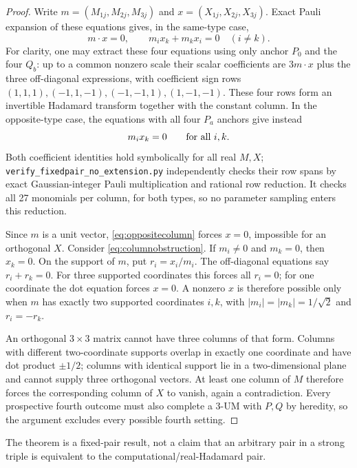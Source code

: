 \documentclass[11pt]{article}
\begin{document}
\begin{proof}
Write $m=(M_{1j},M_{2j},M_{3j})$ and
$x=(X_{1j},X_{2j},X_{3j})$. Exact Pauli expansion of these equations
gives, in the same-type case,
\begin{equation}\label{eq:columnobstruction}
 m\cdot x=0,\qquad m_i x_k+m_k x_i=0\quad(i\ne k).
\end{equation}
For clarity, one may extract these four equations using only anchor
$P_0$ and the four $Q_b$: up to a common nonzero scale their scalar
coefficients are $3m\cdot x$ plus the three off-diagonal expressions,
with coefficient sign rows
$(1,1,1),(-1,1,-1),(-1,-1,1),(1,-1,-1)$.
These four rows form an invertible Hadamard transform together with the
constant column. In the opposite-type case, the equations with all four
$P_a$ anchors give instead
\begin{equation}\label{eq:oppositecolumn}
 m_i x_k=0\qquad\hbox{for all }i,k.
\end{equation}
Both coefficient identities hold symbolically for all real $M,X$;
\texttt{verify\_fixedpair\_no\_extension.py} independently checks their
row spans by exact Gaussian-integer Pauli multiplication and rational
row reduction. It checks all 27 monomials per column, for both types,
so no parameter sampling enters this reduction.

Since $m$ is a unit vector, \eqref{eq:oppositecolumn} forces $x=0$,
impossible for an orthogonal $X$. Consider \eqref{eq:columnobstruction}.
If $m_i\ne0$ and $m_k=0$, then $x_k=0$. On the support of $m$, put
$r_i=x_i/m_i$. The off-diagonal equations say $r_i+r_k=0$.
For three supported coordinates this forces all $r_i=0$; for one
coordinate the dot equation forces $x=0$. A nonzero $x$ is therefore
possible only when $m$ has exactly two supported coordinates $i,k$,
with $|m_i|=|m_k|=1/\sqrt2$ and $r_i=-r_k$.

An orthogonal $3\times3$ matrix cannot have three columns of that form.
Columns with different two-coordinate supports overlap in exactly one
coordinate and have dot product $\pm1/2$; columns with identical support
lie in a two-dimensional plane and cannot supply three orthogonal vectors.
At least one column of $M$ therefore forces the corresponding column of
$X$ to vanish, again a contradiction. Every prospective fourth outcome
must also complete a 3-UM with $P,Q$ by heredity, so the argument excludes
every possible fourth setting.
\end{proof}

The theorem is a fixed-pair result, not a claim that an arbitrary pair
in a strong triple is equivalent to the computational/real-Hadamard pair.
\end{document}
